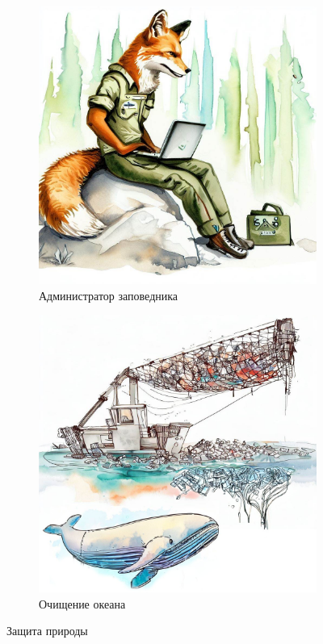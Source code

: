 \documentclass[a5paper,11pt]{memoir}
\begin{document}
\begin{figure}[h]
  \begin{subfigure}{.5\paperwidth}
    \centering
    \includegraphics[width=.8\linewidth]{images/fox-ranger.jpg}
    \caption{Администратор заповедника}
  \end{subfigure}%
  \begin{subfigure}{.5\paperwidth}
    \centering
    \includegraphics[width=.8\linewidth]{images/ocean-cleanup.jpg}
    \caption{Очищение океана}
  \end{subfigure}
  \caption{Защита природы}
\end{figure}
\end{document}

